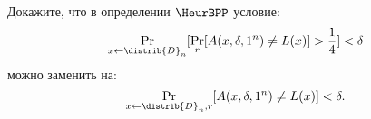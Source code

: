 Докажите, что в определении $\HeurBPP$ условие:
$$
    \Pr\limits_{x \gets \distrib{D}_n}[\Pr\limits_{r}[A(x, \delta, 1^n) \neq L(x)] > \frac{1}{4}] <
    \delta
$$
можно заменить на:
$$
    \Pr\limits_{x \gets \distrib{D}_n, r}[A(x, \delta, 1^n) \neq L(x)] < \delta.
$$